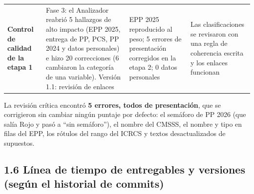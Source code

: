 \documentclass[11pt,letterpaper]{article}
\begin{document}
{\begin{xltabular}{\linewidth}{L{3.40cm}L{4.35cm}L{3.41cm}L{4.55cm}}
\textbf{Control de calidad de la etapa 1} & Fase 3: el Analizador reabrió 5 hallazgos de alto impacto (EPP 2025, entrega de PP, PCS, PP 2024 y datos personales) e hizo 20 correcciones (6 cambiaron la categoría de una variable). Versión 1.1: revisión de enlaces & EPP 2025 reproducido al peso; 5 errores de presentación corregidos en la etapa 2; 0 datos personales & Las clasificaciones se revisaron con una regla de coherencia escrita y los enlaces funcionan \\
\end{xltabular}
}

La revisión crítica encontró \textbf{5 errores, todos de presentación}, que se corrigieron sin cambiar ningún puntaje por defecto: el semáforo de PP 2026 (que salía Rojo y pasó a ``sin semáforo''), el nombre del CMSSS, el nombre y tipo en filas del EPP, los rótulos del rango del ICRCS y textos desactualizados de supuestos.

\subsection*{1.6 Línea de tiempo de entregables y versiones (según el historial de commits)}

\end{document}
